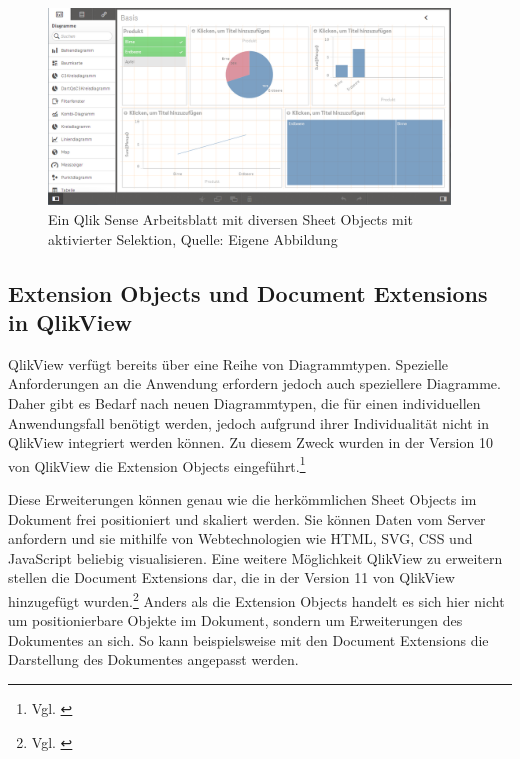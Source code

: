 \ifIncludeFigures\begin{figure}[htbp]
	\centering
		\includegraphics[width=0.95\textwidth]{img/QlikView/SheetInSense.png}
	\caption[Ein Qlik Sense Arbeitsblatt mit diversen Sheet Objects mit aktivierter Selektion]{Ein Qlik Sense Arbeitsblatt mit diversen Sheet Objects mit aktivierter Selektion, Quelle: Eigene Abbildung}
	\label{fig:SheetInSense}
\end{figure}\fi






\subsection{Extension Objects und Document Extensions in QlikView}

QlikView verfügt bereits über eine Reihe von Diagrammtypen. Spezielle Anforderungen an die Anwendung erfordern jedoch auch speziellere Diagramme. Daher gibt es Bedarf nach neuen Diagrammtypen, die für einen individuellen Anwendungs\-fall benötigt werden, jedoch aufgrund ihrer Individualität nicht in QlikView integriert werden können. Zu diesem Zweck wurden in der Version 10 von QlikView die Extension Objects eingeführt.\footnote{Vgl. \cite[S. 163]{redmond2013qlikview}}

Diese Erweiterungen können genau wie die herkömmlichen Sheet Objects im Dokument frei positioniert und skaliert werden. Sie können Daten vom Server anfordern und sie mithilfe von Webtechnologien wie HTML, SVG, CSS und JavaScript beliebig visualisieren.
Eine weitere Möglich\-keit QlikView zu erweitern stellen die Document Extensions dar, die in der Version 11 von QlikView hinzugefügt wurden.\footnote{Vgl. \cite[S. 164]{redmond2013qlikview}} Anders als die Extension Objects handelt es sich hier nicht um positionierbare Objekte im Dokument, sondern um Erweiterungen des Dokumentes an sich. So kann beispielsweise mit den Document Extensions die Darstellung des Dokumentes angepasst werden.

